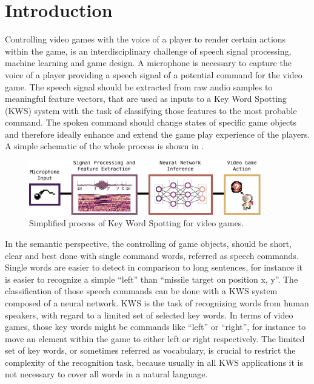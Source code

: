 
\chapter{Introduction}\label{sec:intro}
\thesisStateReady
Controlling video games with the voice of a player to render certain actions within the game, is an interdisciplinary challenge of speech signal processing, machine learning and game design.
A microphone is necessary to capture the voice of a player providing a speech signal of a potential command for the video game.
The speech signal should be extracted from raw audio samples to meaningful feature vectors, that are used as inputs to a Key Word Spotting (KWS) system with the task of classifying those features to the most probable command.
The spoken command should change states of specific game objects and therefore ideally enhance and extend the game play experience of the players.
A simple schematic of the whole process is shown in .
\begin{figure}[!ht]
  \centering
    \includegraphics[width=0.9\textwidth]{./1_intro/figs/intro_kws}
  \caption{Simplified process of Key Word Spotting for video games.}
  \label{fig:intro_kws}
\end{figure}
\FloatBarrier
\noindent
In the semantic perspective, the controlling of game objects, should be short, clear and best done with single command words, referred as speech commands.
Single words are easier to detect in comparison to long sentences, for instance it is easier to recognize a simple \enquote{left} than \enquote{missile target on position x, y}.
The classification of those speech commands can be done with a KWS system composed of a neural network.
KWS is the task of recognizing words from human speakers, with regard to a limited set of selected key words.
In terms of video games, those key words might be commands like \enquote{left} or \enquote{right}, for instance to move an element within the game to either left or right respectively.
The limited set of key words, or sometimes referred as vocabulary, is crucial to restrict the complexity of the recognition task, because usually in all KWS applications it is not necessary to cover all words in a natural language.

